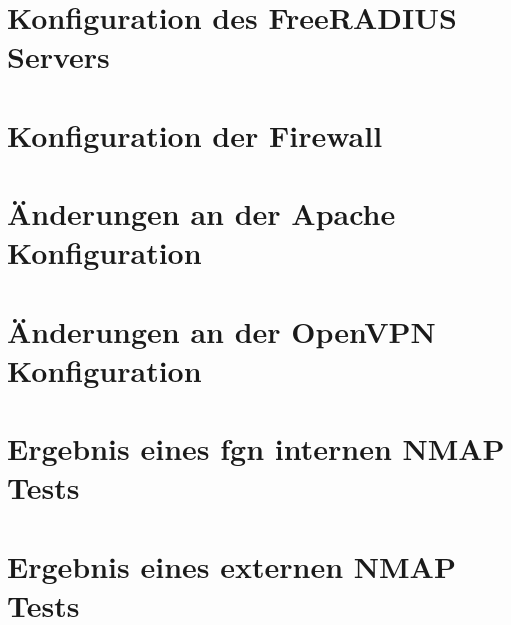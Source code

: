 \documentclass[11pt,a4paper,titlepage=firstiscover]{scrartcl} %
\begin{document}
\section{Konfiguration des FreeRADIUS Servers}\label{sec:RADIUS-Konfig}
\newpage
\section{Konfiguration der Firewall}\label{sec:Firewall-Konfig}
\newpage
\section{Änderungen an der Apache Konfiguration}\label{sec:Apache-Konfig}
\newpage
\section{Änderungen an der OpenVPN Konfiguration}\label{sec:VPN-Konfig}
\newpage
\section{Ergebnis eines fgn internen NMAP Tests}\label{sec:NMAP-Test-int}
\newpage
\section{Ergebnis eines externen NMAP Tests}\label{sec:NMAP-Test-ext}

%
%
\end{document}
